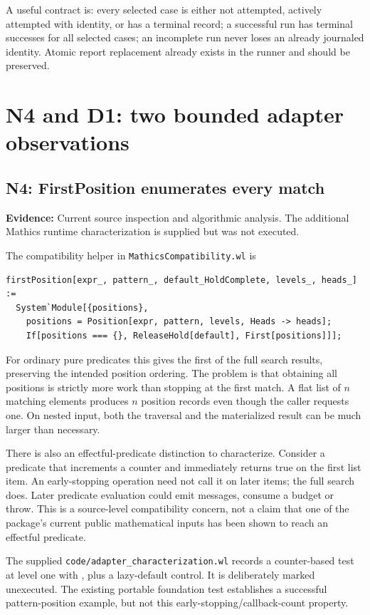 \documentclass[11pt,letterpaper]{article}
\newcommand{\code}[1]{\texttt{\detokenize{#1}}}
\newcommand{\pathcode}[1]{\nolinkurl{#1}}
\newcommand{\evidence}[1]{\textbf{Evidence:} #1}
\begin{document}
A useful contract is: every selected case is either not attempted, actively attempted with identity, or has a terminal record; a successful run has terminal successes for all selected cases; an incomplete run never loses an already journaled identity. Atomic report replacement already exists in the runner and should be preserved.

\section{N4 and D1: two bounded adapter observations}
\subsection{N4: FirstPosition enumerates every match}
\evidence{Current source inspection and algorithmic analysis. The additional Mathics runtime characterization is supplied but was not executed.}

The compatibility helper in \pathcode{MathicsCompatibility.wl} is
\begin{lstlisting}
firstPosition[expr_, pattern_, default_HoldComplete, levels_, heads_] :=
  System`Module[{positions},
    positions = Position[expr, pattern, levels, Heads -> heads];
    If[positions === {}, ReleaseHold[default], First[positions]]];
\end{lstlisting}
For ordinary pure predicates this gives the first of the full search results, preserving the intended position ordering. The problem is that obtaining all positions is strictly more work than stopping at the first match. A flat list of $n$ matching elements produces $n$ position records even though the caller requests one. On nested input, both the traversal and the materialized result can be much larger than necessary.\cite{mathicscompat,wlfirstposition}

There is also an effectful-predicate distinction to characterize. Consider a predicate that increments a counter and immediately returns true on the first list item. An early-stopping operation need not call it on later items; the full \code{Position} search does. Later predicate evaluation could emit messages, consume a budget or throw. This is a source-level compatibility concern, not a claim that one of the package's current public mathematical inputs has been shown to reach an effectful predicate.

The supplied \pathcode{code/adapter_characterization.wl} records a counter-based test at level one with \code{Heads -> False}, plus a lazy-default control. It is deliberately marked unexecuted. The existing portable foundation test establishes a successful pattern-position example, but not this early-stopping/callback-count property.
\end{document}
